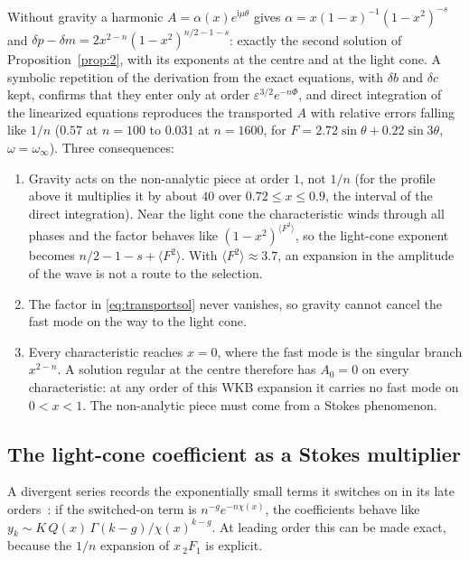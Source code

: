 \documentclass{amsart}
\numberwithin{equation}{section}
\theoremstyle{plain}
\theoremstyle{definition}
\theoremstyle{remark}
\newcommand{\winf}{\omega_\infty}
\newcommand{\eps}{\varepsilon}
\newcommand{\iu}{\mathrm{i}}
\begin{document}
Without gravity a harmonic $A = \alpha(x)e^{\iu\mu\theta}$ gives $\alpha = x(1-x)^{-1}(1-x^2)^{-s}$ and
$\delta p - \delta m = 2x^{2-n}(1-x^2)^{n/2-1-s}$: exactly the second solution of Proposition~\ref{prop:2}, with its
exponents at the centre and at the light cone. A symbolic repetition of the derivation from the exact equations, with
$\delta b$ and $\delta c$ kept, confirms that they enter only at order $\eps^{3/2}e^{-n\Phi}$, and direct integration of the
linearized equations reproduces the transported $A$ with relative errors falling like $1/n$ ($0.57$ at $n = 100$ to $0.031$ at
$n = 1600$, for $F = 2.72\sin\theta + 0.22\sin3\theta$, $\omega = \winf$). Three consequences:
\begin{enumerate}[label=(\roman*),leftmargin=2em]
\item Gravity acts on the non-analytic piece at order $1$, not $1/n$ (for the profile above it multiplies it by about $40$
over $0.72 \le x \le 0.9$, the interval of the direct integration). Near the light cone the characteristic winds through all phases and the factor behaves like
$(1-x^2)^{\langle F^2\rangle}$, so the light-cone exponent becomes $n/2 - 1 - s + \langle F^2\rangle$. With
$\langle F^2\rangle \approx 3.7$, an expansion in the amplitude of the wave is not a route to the selection.
\item The factor in \eqref{eq:transportsol} never vanishes, so gravity cannot cancel the fast mode on the way to the
light cone.
\item Every characteristic reaches $x = 0$, where the fast mode is the singular branch $x^{2-n}$. A solution regular at
the centre therefore has $A_0 = 0$ on every characteristic: at any order of this WKB expansion it carries no fast mode on
$0 < x < 1$. The non-analytic piece must come from a Stokes phenomenon.
\end{enumerate}

\subsection{The light-cone coefficient as a Stokes multiplier}
A divergent series records the exponentially small terms it switches on in its late
orders~\cite{Dingle1973,ChapmanKingAdams1998}: if the switched-on term is $n^{-g}e^{-n\chi(x)}$, the coefficients behave
like $y_k \sim K\,Q(x)\,\Gamma(k-g)/\chi(x)^{k-g}$. At leading order this can be made exact, because the $1/n$ expansion
of $x\,{}_2F_1$ is explicit.
\end{document}
